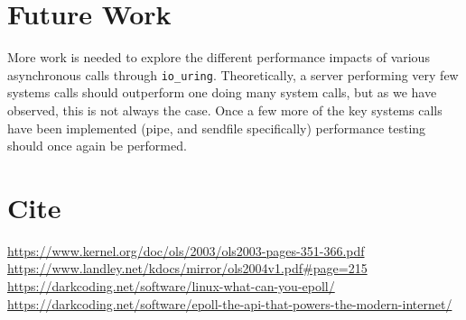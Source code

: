 \documentclass[letterpaper, 10pt, twocolumn]{article}
\begin{document}
\section{Future Work}
\label{sec:orga0ef01c}
More work is needed to explore the different performance impacts of various asynchronous calls through \texttt{io\_uring}. Theoretically, a server performing very few systems calls should outperform one doing many system calls, but as we have observed, this is not always the case. Once a few more of the key systems calls have been implemented (pipe, and sendfile specifically) performance testing should once again be performed.


\section{Cite}
\label{sec:orgc9e4f58}
\url{https://www.kernel.org/doc/ols/2003/ols2003-pages-351-366.pdf}
\url{https://www.landley.net/kdocs/mirror/ols2004v1.pdf\#page=215}
\url{https://darkcoding.net/software/linux-what-can-you-epoll/}
\url{https://darkcoding.net/software/epoll-the-api-that-powers-the-modern-internet/}
\end{document}
